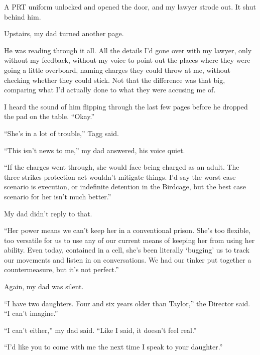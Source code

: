 A PRT uniform unlocked and opened the door, and my lawyer strode out.  It shut behind him.



Upstairs, my dad turned another page.



He was reading through it all.  All the details I'd gone over with my lawyer, only without my feedback, without my voice to point out the places where they were going a little overboard, naming charges they could throw at me, without checking whether they could stick.  Not that the difference was that big, comparing what I'd actually done to what they were accusing me of.



I heard the sound of him flipping through the last few pages before he dropped the pad on the table.  ``Okay.''



``She's in a lot of trouble,'' Tagg said.



``This isn't news to me,'' my dad answered, his voice quiet.



``If the charges went through, she would face being charged as an adult.  The three strikes protection act wouldn't mitigate things.  I'd say the worst case scenario is execution, or indefinite detention in the Birdcage, but the best case scenario for her isn't much better.''



My dad didn't reply to that.



``Her power means we can't keep her in a conventional prison.  She's too flexible, too versatile for us to use any of our current means of keeping her from using her ability.  Even today, contained in a cell, she's been literally `bugging' us to track our movements and listen in on conversations.  We had our tinker put together a countermeasure, but it's not perfect.''



Again, my dad was silent.



``I have two daughters.  Four and six years older than Taylor,'' the Director said.  ``I can't imagine.''



``I can't either,'' my dad said.  ``Like I said, it doesn't feel real.''



``I'd like you to come with me the next time I speak to your daughter.''




